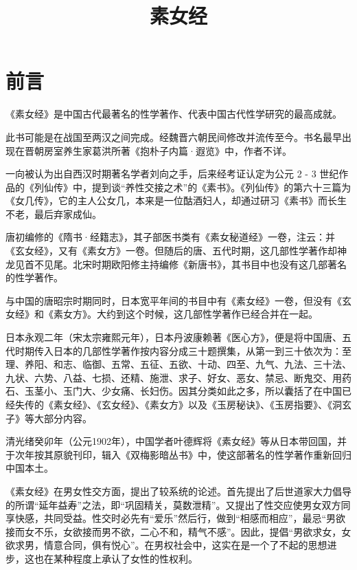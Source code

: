 \documentclass[a4paper,12pt,UTF8,twoside]{ctexbook}
\title{\heiti\zihao{0} 素女经}
\author{}
\date{}
\begin{document}
\maketitle
\tableofcontents

\frontmatter

\chapter{前言}

《素女经》是中国古代最著名的性学著作、代表中国古代性学研究的最高成就。

此书可能是在战国至两汉之间完成。经魏晋六朝民间修改并流传至今。书名最早出现在晋朝房室养生家葛洪所著《抱朴子内篇·遐览》中，作者不详。

一向被认为出自西汉时期著名学者刘向之手，后来经考证认定为公元 2 - 3 世纪作品的《列仙传》中，提到谈“养性交接之术”的《素书》。《列仙传》的第六十三篇为《女几传》，它的主人公女几，本来是一位酤酒妇人，却通过研习《素书》而长生不老，最后弃家成仙。

唐初编修的《隋书·经籍志》，其子部医书类有《素女秘道经》一卷，注云：并《玄女经》，又有《素女方》一卷。但随后的唐、五代时期，这几部性学著作却神龙见首不见尾。北宋时期欧阳修主持编修《新唐书》，其书目中也没有这几部著名的性学著作。

与中国的唐昭宗时期同时，日本宽平年间的书目中有《素女经》一卷，但没有《玄女经》和《素女方》。大约到这个时候，这几部性学著作已经合并在一起。

日本永观二年（宋太宗雍熙元年），日本丹波康赖著《医心方》，便是将中国唐、五代时期传入日本的几部性学著作按内容分成三十题撰集，从第一到三十依次为：至理、养阳、和志、临御、五常、五征、五欲、十动、四至、九气、九法、三十法、九状、六势、八益、七损、还精、施泄、求子、好女、恶女、禁忌、断鬼交、用药石、玉茎小、玉门大、少女痛、长妇伤。因其分类如此之多，所以囊括了在中国已经失传的《素女经》、《玄女经》、《素女方》以及《玉房秘诀》、《玉房指要》、《洞玄子》等大部分内容。

清光绪癸卯年（公元1902年），中国学者叶德辉将《素女经》等从日本带回国，并于次年按其原貌刊印，辑入《双梅影暗丛书》中，使这部著名的性学著作重新回归中国本土。

《素女经》在男女性交方面，提出了较系统的论述。首先提出了后世道家大力倡导的所谓“延年益寿”之法，即“巩固精关，莫数泄精”。又提出了性交应使男女双方同享快感，共同受益。性交时必先有“爱乐”然后行，做到“相感而相应”，最忌“男欲接而女不乐，女欲接而男不欲，二心不和，精气不感”。因此，提倡“男欲求女，女欲求男，情意合同，俱有悦心”。在男权社会中，这实在是一个了不起的思想进步，这也在某种程度上承认了女性的性权利。
\end{document}
